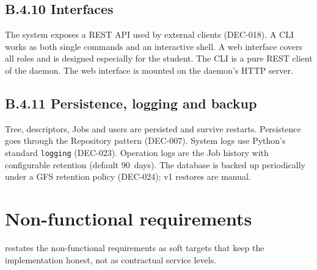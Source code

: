\subsection*{B.4.10 Interfaces}
The system exposes a REST API used by external clients (DEC-018).
A CLI works as both single commands and an interactive shell. A
web interface covers all roles and is designed especially for the
student. The CLI is a pure REST client of the daemon. The web
interface is mounted on the daemon's HTTP server.

\subsection*{B.4.11 Persistence, logging and backup}
Tree, descriptors, Jobs and users are persisted and survive
restarts. Persistence goes through the Repository pattern (DEC-007).
System logs use Python's standard \texttt{logging} (DEC-023).
Operation logs are the Job history with configurable retention
(default 90~days). The database is backed up periodically under a
GFS retention policy (DEC-024); v1 restores are manual.

\section{Non-functional requirements}

 restates the non-functional requirements as
soft targets that keep the implementation honest, not as
contractual service levels.

